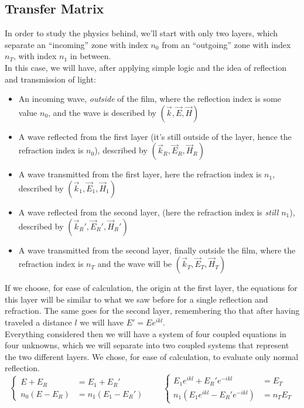 \documentclass[../electromagnetism.tex]{subfiles}
\begin{document}
\subsection{Transfer Matrix}
In order to study the physics behind, we'll start with only two layers, which separate an ``incoming'' zone with index $n_0$ from an ``outgoing'' zone with index $n_T$, with index $n_1$ in between.\\
In this case, we will have, after applying simple logic and the idea of reflection and transmission of light:
\begin{itemize}
\item An incoming wave, \textit{outside} of the film, where the reflection index is some value $n_0$, and the wave is described by $(\vec{k},\vec{E},\vec{H})$
\item A wave reflected from the first layer (it's still outside of the layer, hence the refraction index is $n_0$), described by $(\vec{k}_R,\vec{E}_R,\vec{H}_R)$
\item A wave transmitted from the first layer, here the refraction index is $n_1$, described by $(\vec{k}_1,\vec{E}_1,\vec{H}_1)$
\item A wave reflected from the second layer, (here the refraction index is \textit{still} $n_1$), described by $(\vec{k}_R',\vec{E}_R',\vec{H}_R')$
\item A wave transmitted from the second layer, finally outside the film, where the refraction index is $n_T$ and the wave will be $(\vec{k}_T,\vec{E}_T,\vec{H}_T)$
\end{itemize}
If we choose, for ease of calculation, the origin at the first layer, the equations for this layer will be similar to what we saw before for a single reflection and refraction. The same goes for the second layer, remembering tho that after having traveled a distance $l$ we will have $E'=Ee^{ikl}$.\\
Everything considered then we will have a system of four coupled equations in four unknowns, which we will separate into two coupled systems that represent the two different layers. We chose, for ease of calculation, to evaluate only normal reflection.
\begin{equation}
	\left\{ \begin{aligned}
		E+E_R&= E_1+E_R'\\
		n_0\left( E-E_R \right)&= n_1\left( E_1-E_R' \right)
	\end{aligned}\right.
	\qquad
	\left\{ \begin{aligned}
		E_1e^{ikl}+E_R'e^{-ikl}&= E_T\\
		n_1\left( E_1e^{ikl}-E_R'e^{-ikl} \right)&= n_TE_T
	\end{aligned}\right.
	\label{eq:freq.mlt}
\end{equation}
\end{document}
